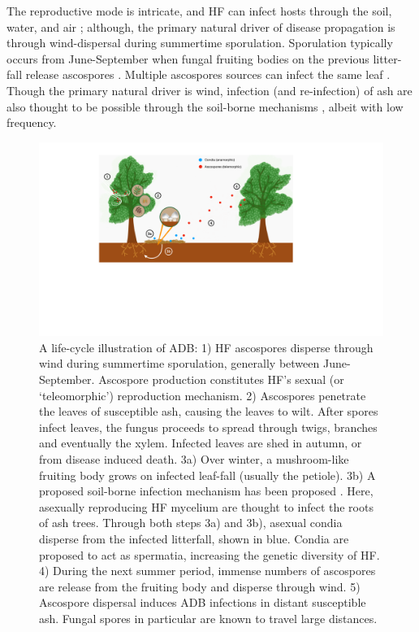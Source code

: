 The reproductive mode is intricate, and HF can infect hosts through the soil,
water, and air \cite{gross2012reproductive}; 
although, the primary natural driver of disease propagation is through wind-dispersal
during summertime sporulation. Sporulation typically occurs from June-September when 
fungal fruiting bodies on the previous litter-fall release ascospores \cite{grosdidier2018tracking, hietala2013invasive}.
Multiple ascospores sources can infect the same leaf \cite{gross2012reproductive}. 
Though the primary natural driver is wind, infection (and re-infection) of ash are also thought to be possible 
through the soil-borne mechanisms \cite{fones2016role}, albeit with low frequency.

\begin{figure}
    \centering
    \includegraphics[scale=0.425]{chapter2/figures/ash-dieback-illustration.pdf}
    \caption{A life-cycle illustration of ADB: 
    1) HF ascospores disperse through wind during summertime sporulation, generally between June-September.
    Ascospore production constitutes HF's sexual (or `teleomorphic') reproduction mechanism.
    2) Ascospores penetrate the leaves of susceptible ash, causing the leaves to wilt.
       After spores infect leaves, the fungus proceeds to spread through twigs, branches and eventually the xylem.
       Infected leaves are shed in autumn, or from disease induced death.
    3a) Over winter, a mushroom-like fruiting body grows on infected leaf-fall (usually the petiole).
    3b) A proposed soil-borne infection mechanism has been proposed \cite{fones2016role}.
        Here, asexually reproducing HF mycelium are thought to infect the roots of ash trees.
    Through both steps 3a) and 3b), asexual condia disperse from the infected litterfall, shown in blue.
    Condia are proposed to act as spermatia, increasing the genetic diversity of HF.
    4) During the next summer period, immense numbers of ascospores are release from the fruiting body
    and disperse through wind.
    5) Ascospore dispersal induces ADB infections in distant susceptible ash. Fungal spores in particular 
    are known to travel large distances.
    }
    \label{fig:my_label}
\end{figure}

